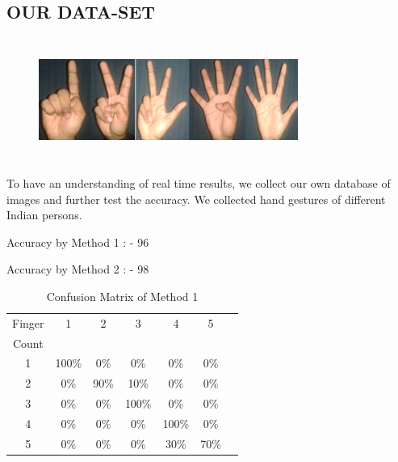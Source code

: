 \documentclass[conference]{IEEEtran}
\begin{document}
\subsection{OUR DATA-SET}
\begin{figure}[h!]
	\centering
	\includegraphics[width = 8.5cm, height = 4cm]{ourdataset}
\end{figure}

To have an understanding of real time results, we collect our own database of images and further test the accuracy. We collected hand gestures of different Indian persons.

Accuracy by Method 1 : - 96%

Accuracy by Method 2 : - 98%

\begin{table}[h!]
\caption{Confusion Matrix of Method 1}
\begin{center}
\begin{tabular}{|c|c|c|c|c|c|c|}
\hline
\multicolumn{1}{|c|}{Finger}
& \multicolumn{1}{|c|}{1}
& \multicolumn{1}{|c|}{2}
& \multicolumn{1}{|c|}{3}
& \multicolumn{1}{|c|}{4}
& \multicolumn{1}{|c|}{5}\\
Count &  &  &  &  &\\ \hline
1  &  100\%  &  0\%  & 0\%  & 0\% & 0\%\\ \hline
2  &  0\%  &  90\%  & 10\%  & 0\% & 0\%\\ \hline
3  &  0\%  &  0\%  & 100\%  & 0\% & 0\%\\ \hline
4  &  0\%  &  0\%  & 0\%  & 100\% & 0\%\\ \hline
5  &  0\%  &  0\%  & 0\%  & 30\% & 70\%\\ \hline
\end{tabular}
\label{table-tab2}
\end{center}
\end{table}
\end{document}
